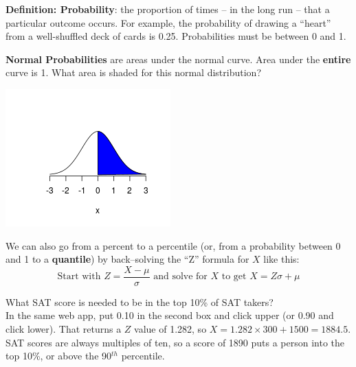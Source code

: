 {\bf Definition:  Probability}: the proportion of times -- in the long run
-- that a particular outcome occurs.  For example, the probability of
drawing a ``heart'' from a well-shuffled deck of cards is
0.25. Probabilities must be between 0 and 1. 


\begin{minipage}{.80\linewidth}
{\bf Normal Probabilities} are areas under the normal curve.  Area
under the  {\bf entire} curve is 1.   What area is shaded for this normal
distribution? \vspace*{2cm}
\end{minipage}
\includegraphics[width=.2\linewidth]{../plots/halfNormal.png}
\vspace{-1.9cm}

We can also go from a percent to a percentile (or, from a probability
between 0 and 1 to a {\bf quantile}) by back--solving the ``Z'' formula for
$X$ like this:  
$$\mbox{Start with } Z = \frac{X-\mu}{\sigma}  \mbox{ and solve for
  $X$ to get }
  X = Z\sigma + \mu $$

What SAT score is needed to be in the top 10\% of SAT takers?\\
In the same web app, put 0.10 in the second box and click upper (or 0.90
and click lower). That returns a $Z$ value of 1.282, so 
$ X = 1.282 \times 300 + 1500 = 1884.5$.  SAT  scores are always
multiples of ten, so a score of 1890 puts a person into the top 10\%,
or above the 90$^{th}$ percentile. 


